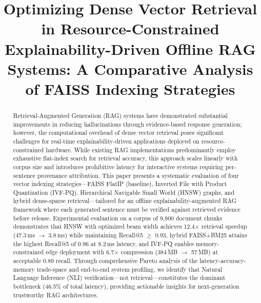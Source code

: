 \documentclass[conference]{IEEEtran}
\begin{document}
\title{Optimizing Dense Vector Retrieval in Resource-Constrained Explainability-Driven Offline RAG Systems: A Comparative Analysis of FAISS Indexing Strategies}

\author{
\and
{}
}

\maketitle

\begin{abstract}
Retrieval-Augmented Generation (RAG) systems have demonstrated substantial improvements in reducing hallucinations through evidence-based response generation; however, the computational overhead of dense vector retrieval poses significant challenges for real-time explainability-driven applications deployed on resource-constrained hardware. While existing RAG implementations predominantly employ exhaustive flat-index search for retrieval accuracy, this approach scales linearly with corpus size and introduces prohibitive latency for interactive systems requiring per-sentence provenance attribution. This paper presents a systematic evaluation of four vector indexing strategies—FAISS FlatIP (baseline), Inverted File with Product Quantization (IVF-PQ), Hierarchical Navigable Small World (HNSW) graphs, and hybrid dense-sparse retrieval—tailored for an offline explainability-augmented RAG framework where each generated sentence must be verified against retrieved evidence before release. Experimental evaluation on a corpus of 9,800 document chunks demonstrates that HNSW with optimized beam width achieves 12.4$\times$ retrieval speedup (47.3\,ms $\to$ 3.8\,ms) while maintaining Recall@5 $\geq$ 0.93, hybrid FAISS+BM25 attains the highest Recall@5 of 0.96 at 8.2\,ms latency, and IVF-PQ enables memory-constrained edge deployment with 6.7$\times$ compression (384\,MB $\to$ 57\,MB) at acceptable 0.89 recall. Through comprehensive Pareto analysis of the latency-accuracy-memory trade-space and end-to-end system profiling, we identify that Natural Language Inference (NLI) verification—not retrieval—constitutes the dominant bottleneck (46.5\% of total latency), providing actionable insights for next-generation trustworthy RAG architectures.
\end{abstract}
\end{document}
